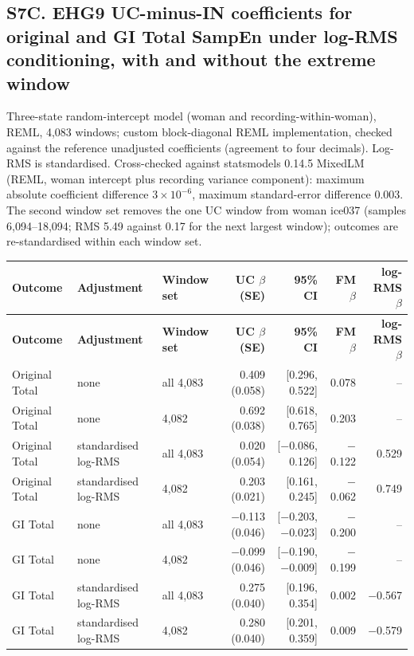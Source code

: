 \documentclass[10pt]{article}
\begin{document}
\subsection*{S7C. EHG9 UC-minus-IN coefficients for original and GI Total SampEn under log-RMS conditioning, with and without the extreme window}
Three-state random-intercept model (woman and recording-within-woman), REML, 4,083 windows; custom block-diagonal REML implementation, checked against the reference unadjusted coefficients (agreement to four decimals). Log-RMS is standardised. Cross-checked against statsmodels 0.14.5 MixedLM (REML, woman intercept plus recording variance component): maximum absolute coefficient difference $3\times10^{-6}$, maximum standard-error difference 0.003. The second window set removes the one UC window from woman ice037 (samples 6,094--18,094; RMS 5.49 against 0.17 for the next largest window); outcomes are re-standardised within each window set.
\begin{longtable}{p{2.4cm}p{3.4cm}p{1.8cm}rrrr}
\toprule
\textbf{Outcome} & \textbf{Adjustment} & \textbf{Window set} & \textbf{UC $\beta$ (SE)} & \textbf{95\% CI} & \textbf{FM $\beta$} & \textbf{log-RMS $\beta$} \\
\midrule
\endfirsthead
\toprule
\textbf{Outcome} & \textbf{Adjustment} & \textbf{Window set} & \textbf{UC $\beta$ (SE)} & \textbf{95\% CI} & \textbf{FM $\beta$} & \textbf{log-RMS $\beta$} \\
\midrule
\endhead
Original Total & none & all 4,083 & 0.409 (0.058) & [0.296, 0.522] & 0.078 & -- \\
Original Total & none & 4,082 & 0.692 (0.038) & [0.618, 0.765] & 0.203 & -- \\
Original Total & standardised log-RMS & all 4,083 & 0.020 (0.054) & [$-$0.086, 0.126] & $-$0.122 & 0.529 \\
Original Total & standardised log-RMS & 4,082 & 0.203 (0.021) & [0.161, 0.245] & $-$0.062 & 0.749 \\
GI Total & none & all 4,083 & $-$0.113 (0.046) & [$-$0.203, $-$0.023] & $-$0.200 & -- \\
GI Total & none & 4,082 & $-$0.099 (0.046) & [$-$0.190, $-$0.009] & $-$0.199 & -- \\
GI Total & standardised log-RMS & all 4,083 & 0.275 (0.040) & [0.196, 0.354] & 0.002 & $-$0.567 \\
GI Total & standardised log-RMS & 4,082 & 0.280 (0.040) & [0.201, 0.359] & 0.009 & $-$0.579 \\
\bottomrule
\end{longtable}
\end{document}
